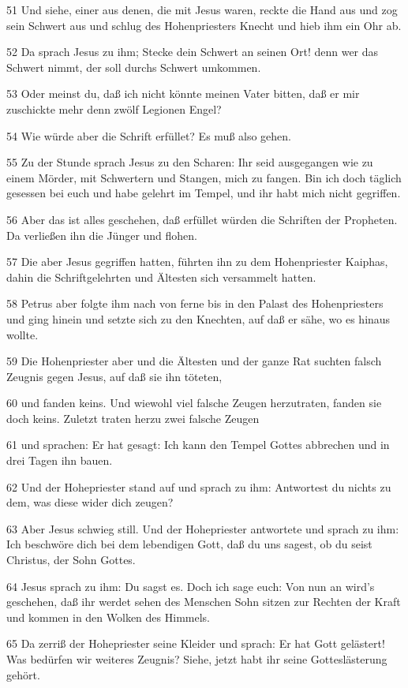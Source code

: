 \par 51 Und siehe, einer aus denen, die mit Jesus waren, reckte die Hand aus und zog sein Schwert aus und schlug des Hohenpriesters Knecht und hieb ihm ein Ohr ab.
\par 52 Da sprach Jesus zu ihm; Stecke dein Schwert an seinen Ort! denn wer das Schwert nimmt, der soll durchs Schwert umkommen.
\par 53 Oder meinst du, daß ich nicht könnte meinen Vater bitten, daß er mir zuschickte mehr denn zwölf Legionen Engel?
\par 54 Wie würde aber die Schrift erfüllet? Es muß also gehen.
\par 55 Zu der Stunde sprach Jesus zu den Scharen: Ihr seid ausgegangen wie zu einem Mörder, mit Schwertern und Stangen, mich zu fangen. Bin ich doch täglich gesessen bei euch und habe gelehrt im Tempel, und ihr habt mich nicht gegriffen.
\par 56 Aber das ist alles geschehen, daß erfüllet würden die Schriften der Propheten. Da verließen ihn die Jünger und flohen.
\par 57 Die aber Jesus gegriffen hatten, führten ihn zu dem Hohenpriester Kaiphas, dahin die Schriftgelehrten und Ältesten sich versammelt hatten.
\par 58 Petrus aber folgte ihm nach von ferne bis in den Palast des Hohenpriesters und ging hinein und setzte sich zu den Knechten, auf daß er sähe, wo es hinaus wollte.
\par 59 Die Hohenpriester aber und die Ältesten und der ganze Rat suchten falsch Zeugnis gegen Jesus, auf daß sie ihn töteten,
\par 60 und fanden keins. Und wiewohl viel falsche Zeugen herzutraten, fanden sie doch keins. Zuletzt traten herzu zwei falsche Zeugen
\par 61 und sprachen: Er hat gesagt: Ich kann den Tempel Gottes abbrechen und in drei Tagen ihn bauen.
\par 62 Und der Hohepriester stand auf und sprach zu ihm: Antwortest du nichts zu dem, was diese wider dich zeugen?
\par 63 Aber Jesus schwieg still. Und der Hohepriester antwortete und sprach zu ihm: Ich beschwöre dich bei dem lebendigen Gott, daß du uns sagest, ob du seist Christus, der Sohn Gottes.
\par 64 Jesus sprach zu ihm: Du sagst es. Doch ich sage euch: Von nun an wird's geschehen, daß ihr werdet sehen des Menschen Sohn sitzen zur Rechten der Kraft und kommen in den Wolken des Himmels.
\par 65 Da zerriß der Hohepriester seine Kleider und sprach: Er hat Gott gelästert! Was bedürfen wir weiteres Zeugnis? Siehe, jetzt habt ihr seine Gotteslästerung gehört.
